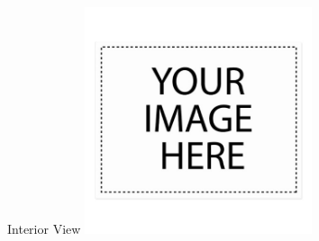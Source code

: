 \documentclass[10pt]{beamer}
\begin{document}
	\begin{frame}{Interior View}
		\includegraphics[width=0.5\textwidth]{Interior_View.png}
	\end{frame}
\end{document}
